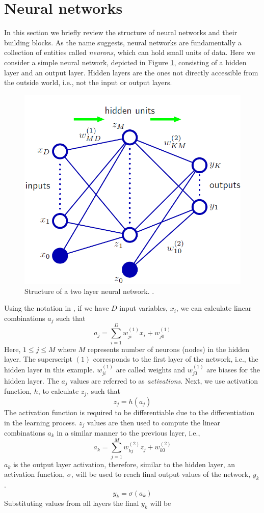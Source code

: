 \section{Neural networks}
In this section we briefly review the structure of neural networks and their building blocks. As the name suggests, neural networks are fundamentally a collection of entities called \textit{neurons}, which can hold small units of data. Here we consider a simple neural network, depicted in Figure \ref{fig:nn}, consisting of a hidden layer and an output layer. Hidden layers are the ones not directly accessible from the outside world, i.e., not the input or output layers.
\begin{figure}
    \includegraphics[width=0.5\linewidth ]{figures/neural_net.png}
    \centering
    \caption{Structure of a two layer neural network. \cite{bishop2006pattern}.}
    \label{fig:nn}
\end{figure}

Using the notation in \cite{bishop2006pattern}, if we have $D$ input variables, $x_{i}$, we can calculate linear combinations $a_{j}$ such that
\[
    a_{j}=\sum_{i=1}^{D}w^{(1)}_{ji}x_{i} + w^{(1)}_{j0}
\]
Here, $1 \leq j \leq M$ where $M$ represents number of neurons (nodes) in the hidden layer. The superscript $(1)$ corresponds to the first layer of the network, i.e., the hidden layer in this example. $w^{(1)}_{ji}$ are called weights and $w^{(1)}_{j0}$ are biases for the hidden layer.
The $a_{j}$ values are referred to as \textit{activations}. Next, we use activation function, $h$, to calculate $z_{j}$, such that
\[
    z_{j}=h(a_{j})
\]
The activation function is required to be differentiable due to the differentiation in the learning process. $z_{j}$ values are then used to compute the linear combinations $a_{k}$ in a similar manner to the previous layer, i.e., 
\[
a_{k}=\sum_{j=1}^{M}w^{(2)}_{kj}z_{j} + w^{(2)}_{k0}
\]
$a_{k}$ is the output layer activation, therefore, similar to the hidden layer, an activation function, $\sigma$, will be used to reach final output values of the network, $y_{k}$.
\[
y_{k}=\sigma(a_{k})
\]
Substituting values from all layers the final $y_k$ will be


